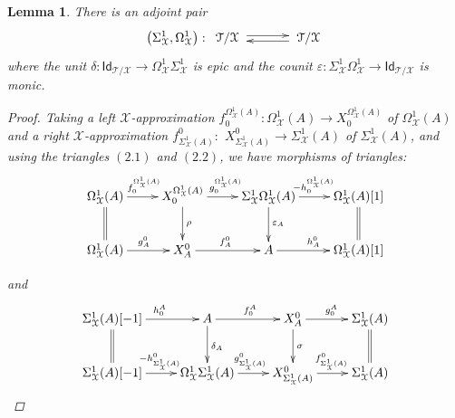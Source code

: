 \documentclass[oneside, a4paper,reqno]{amsart}
\numberwithin{equation}{section}
\newtheorem{lem}[thm]{Lemma}
\theoremstyle{definition}
\begin{document}
 \begin{lem} There is  an adjoint pair
 \[
\big(\Sigma^{1}_{\mathcal X},\Omega^{1}_{\mathcal X}\big) \, \colon \, \xymatrix@C=2.75pc {{\mathcal T}/{\mathcal X} \,\, \ar@<0.5ex>[r]^-{{\mathsf{}}} & \,\, \ar@<0.5ex>[l]^-{{\,\, \mathsf{}}}{\mathcal T}/{\mathcal X}}
\]
where the unit $\delta : \mathsf{Id}_{{\mathcal T}/{\mathcal X}} {\longrightarrow} \Omega^{1}_{\mathcal X}\Sigma^{1}_{\mathcal X}$ is epic and the counit $\varepsilon : \Sigma^{1}_{\mathcal X}\Omega^{1}_{\mathcal X} {\longrightarrow} \mathsf{Id}_{{\mathcal T}/{\mathcal X}}$ is monic.
\begin{proof} Taking a left ${\mathcal X}$-approximation $f^{\Omega^{1}_{\mathcal X}(A)}_{0}  \colon \Omega^{1}_{\mathcal X}(A) {\longrightarrow} X^{\Omega^{1}_{\mathcal X}(A)}_{0}$ of $\Omega^{1}_{\mathcal X}(A)$ and a right ${\mathcal X}$-approximation $f^{0}_{\Sigma^{1}_{\mathcal X}(A)} \colon$ $X^{0}_{\Sigma^{1}_{\mathcal X}(A)} {\longrightarrow} \Sigma^{1}_{\mathcal X}(A)$ of $\Sigma^{1}_{\mathcal X}(A)$, and using the triangles $(2.1)$ and $(2.2)$,   we have morphisms of triangles:
\[
  \xymatrix{
    \Omega^{1}_{\mathcal X}(A) \ar[r]^{f^{\Omega^{1}_{\mathcal X}(A)}_{0}}\ar@{=}[d]&
    X^{\Omega^{1}_{\mathcal X}(A)}_{0} \ar[r]^{g^{\Omega^{1}_{\mathcal X}(A)}_{0}}\ar[d]^{\rho}&
    \Sigma^{1}_{\mathcal X}\Omega^{1}_{\mathcal X}(A) \ar[d]^{\varepsilon_{A}} \ar[r]^{-h^{\Omega^{1}_{\mathcal X}(A)}_{0}}&
    \Omega^{1}_{\mathcal X}(A)[1] \ar@{=}[d] \\
    \Omega^{1}_{\mathcal X}(A) \ar[r]^{g^{0}_{A}}& X^{0}_{A} \ar[r]^{f^{0}_{A}}& A\ar[r]^{h^{0}_{A}} & \Omega^{1}_{\mathcal X}(A)[1]}
    \]

and  
  \[\xymatrix{
    \Sigma^{1}_{\mathcal X}(A)[-1] \ar[r]^{h^{A}_{0}}\ar@{=}[d]&
    A \ar[r]^{f^{A}_{0}}\ar[d]^{\delta_{A}}&
    X^{0}_{A} \ar[d]^{\sigma} \ar[r]^{g^{A}_{0}}&
    \Sigma^{1}_{\mathcal X}(A)\ar@{=}[d] \\
    \Sigma^{1}_{\mathcal X}(A)[-1] \ar[r]^{-h^{0}_{\Sigma^{1}_{\mathcal X}(A)}}& \Omega^{1}_{\mathcal X}\Sigma^{1}_{\mathcal X}(A) \ar[r]^{g^{0}_{\Sigma^{1}_{\mathcal X}(A)}}& X^{0}_{\Sigma^{1}_{\mathcal X}(A)}\ar[r]^{f^{0}_{\Sigma^{1}_{\mathcal X}(A)}} & \Sigma^{1}_{\mathcal X}(A)}  
    \]
    

\end{proof}
\end{lem}
\end{document}
